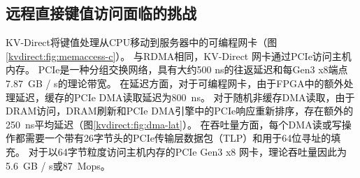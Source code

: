 \iffalse
\subsection{FPGA 可编程网卡}
\label{kvdirect:sec:programmable-nic}

十年前，处理器频率扩展速度放慢，人们转向多核和并发\cite {sutter2005free}。
如今，功率上限意味着多核扩展也遇到了困难\cite {esmaeilzadeh2013power}。
人们现在转向领域定制架构（DSA）以获得更好的性能。


由于网络速度和CPU网络处理能力的不匹配日益增加，带有FPGA的可编程网卡 \cite {vfp,greenberg2015sdn,li2016clicknp,caulfield2016cloud} 现在可以在数据中心进行大规模部署。
本文使用的可编程网卡的核心是FPGA，带有嵌入式网卡芯片以连接到网络。
可编程网卡通常带有板载DRAM作为数据包缓冲区和用于网卡固件的运行时内存\cite {li2016clicknp}，但DRAM通常不足以容纳整个键值存储。
\fi

\subsection{远程直接键值访问面临的挑战}
\label{kvdirect:sec:challenge}

KV-Direct将键值处理从CPU移动到服务器中的可编程网卡（图\ref {kvdirect:fig:memaccess-c}）。
与RDMA相同，KV-Direct 网卡通过PCIe访问主机内存。 PCIe是一种分组交换网络，具有大约500 ns的往返延迟和每Gen3 x8端点7.87~GB / s的理论带宽。
在延迟方面，对于可编程网卡，由于FPGA中的额外处理延迟，缓存的PCIe DMA读取延迟为800~ns。
对于随机非缓存DMA读取，由于DRAM访问，DRAM刷新和PCIe DMA引擎中的PCIe响应重新排序，存在额外的250~ns平均延迟（图\ref {kvdirect:fig:dma-lat}）。
在吞吐量方面，每个DMA读或写操作都需要一个带有26字节头的PCIe传输层数据包（TLP）和用于64位寻址的填充。
对于以64字节粒度访问主机内存的PCIe Gen3 x8 网卡，理论吞吐量因此为5.6~GB / s或87~Mops。

